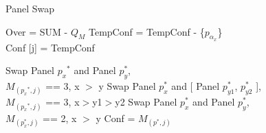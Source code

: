 \documentclass{article}
\begin{document}
\begin{algorithm}
\caption{Panel Swap}
\LinesNumbered
{}
Over = SUM - $Q_M$ \;
    {
    {TempConf = TempConf - \{$p_{\alpha_x}$\}\\
    Conf [j] = TempConf\\}
    }
\For{}{}
    
    {
      {
        {Swap Panel ${p_x}^*$ and Panel $p^*_y$, \\$M_{({p_x}^*, j)}$ == 3, x $>$ y}
           {Swap Panel ${p^*_x}$ and [ Panel $p^*_{y1}$, $p^*_{y2}$ ], \\$M_{({p_x}^*, j)}$ == 3, x$>$y1$>$y2}
              {Swap Panel ${p^*_x}$ and Panel $p^*_y$,\\$M_{({p^*_x}, j)}$ == 2, x $>$ y}
      }
    Conf = $M_{(p^*, j)}$}
\end{algorithm}
\end{document}
